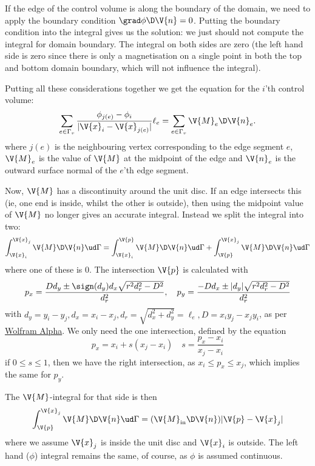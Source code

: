 \documentclass[sigconf]{acmart}
\begin{document}
If the edge of the control volume is along the boundary of the domain, we need to apply the boundary condition $ \grad \phi \D \V{n} = 0$. Putting the boundary condition into the integral gives us the solution: we just should not compute the integral for domain boundary. The integral on both sides are zero (the left hand side is zero since there is only a magnetisation on a single point in both the top and bottom domain boundary, which will not influence the integral).

Putting all these considerations together we get the equation for the $ i $'th control volume:
\begin{equation}\label{key}
	\sum_{e \in \Gamma_v} \frac{\phi_{j(e)}-\phi_i}{|\V{x}_i - \V{x}_{j(e)}|} \ell_e = \sum_{e\in \Gamma_v} \V{M}_e \D \V{n}_e.
\end{equation}
where $ j(e) $ is the neighbouring vertex corresponding to the edge segment $ e $, $ \V{M}_e $ is the value of $ \V{M} $ at the midpoint of the edge and $ \V{n}_e $ is the outward surface normal of the $ e $'th edge segment.

Now, $ \V{M} $ has a discontinuity around the unit disc. If an edge intersects this (ie, one end is inside, whilst the other is outside), then using the midpoint value of $ \V{M} $ no longer gives an accurate integral. Instead we split the integral into two:
\begin{equation}\label{key}
	\int_{\V{x}_i}^{\V{x}_j} \V{M}\D \V{n} \ud \Gamma = \int_{\V{x}_i}^{\V{p}} \V{M}\D \V{n} \ud \Gamma + \int_{\V{p}}^{\V{x}_j}\V{M}\D \V{n} \ud \Gamma
\end{equation}
where one of these is 0. The intersection $ \V{p} $ is calculated with
\begin{equation}\label{key}
	p_x = \frac{D d_y \pm \sign( d_y) d_x \sqrt{r^2 d_r^2 - D^2}}{d_r^2}, \quad p_y = \frac{-D d_x \pm |d_y| \sqrt{r^2 d_r^2 - D^2}}{d_r^2}
\end{equation}
with $ d_y = y_i-y_j, d_x = x_i - x_j, d_r = \sqrt{d_x^2 + d_y^2} = \ell_e , D = x_i y_j-x_jy_i$, as per \href{http://mathworld.wolfram.com/Circle-LineIntersection.html}{Wolfram Alpha}. We only need the one intersection, defined by the equation
\begin{equation}\label{key}
	p_x = x_i + s(x_j - x_i) \quad s = \frac{p_x-x_i}{x_j-x_i}
\end{equation}
if $ 0\leq s \leq 1 $, then we have the right intersection, as $ x_i \leq p_x \leq x_j $, which implies the same for $ p_y $.

The $ \V{M} $-integral for that side is then
\begin{equation}\label{key}
	\int_{\V{p}}^{\V{x}_j}\V{M}\D \V{n} \ud \Gamma = (\V{M}_{\text{in}} \D \V{n}) |\V{p}-\V{x}_j|
\end{equation}
where we assume $ \V{x}_j $ is inside the unit disc and $ \V{x}_i $ is outside. The left hand ($ \phi $) integral remains the same, of course, as $ \phi $ is assumed continuous.
\end{document}
